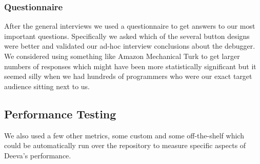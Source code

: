 \documentclass[11pt, a4paper]{article}
\begin{document}
\subsubsection{Questionnaire}
\begin{figure}[h!]
\centering
{}
\quad
{}
\end{figure}

After the general interviews we used a questionnaire to get answers to our most important questions.
Specifically we asked which of the several button designs were better and validated our ad-hoc interview conclusions about the debugger.
We considered using something like Amazon Mechanical Turk to get larger numbers of responses which might have been more statistically significant but it seemed silly when we had hundreds of programmers who were our exact target audience sitting next to us.


\subsection{Performance Testing}
We also used a few other metrics, some custom and some off-the-shelf which could be automatically run over the repository to measure specific aspects of Deeva’s performance.
\end{document}
